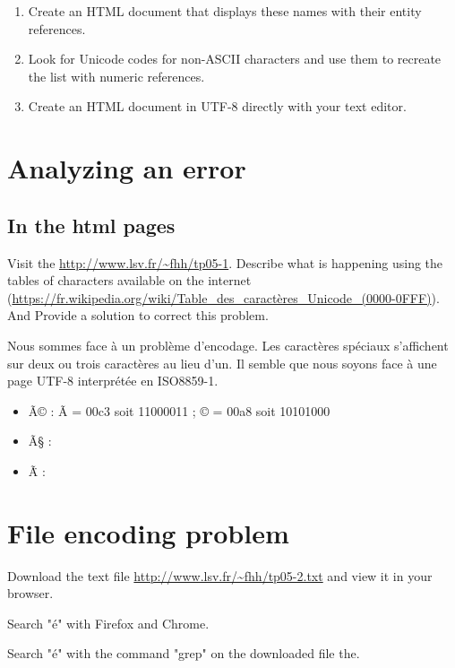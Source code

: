 \documentclass[11pt]{article}
\begin{document}
\begin{enumerate}
    \item Create an HTML document that displays these names with their entity references.
    \item Look for Unicode codes for non-ASCII characters and use them to recreate the list with numeric references.
    \item Create an HTML document in UTF-8 directly with your text editor.
\end{enumerate}




\section{Analyzing an error}


\subsection{In the html pages}
Visit the \url{http://www.lsv.fr/~fhh/tp05-1}\bigskip. Describe what is happening using the tables of characters available on the internet (\url{https://fr.wikipedia.org/wiki/Table_des_caractères_Unicode_(0000-0FFF)}). 
And Provide a solution to correct this problem.


\begin{solution}

Nous sommes face à un problème d'encodage. Les caractères spéciaux s'affichent
sur deux ou trois caractères au lieu d'un. Il semble que nous soyons face à une
page UTF-8 interprétée en ISO8859-1.

\begin{itemize}
\item Ã© : Ã = 00c3 soit 11000011 ; © = 00a8 soit 10101000
\item Ã§ :
\item Ã\"{ } : 
\end{itemize}

\end{solution}



\section{File encoding problem}
Download the text file \url{http://www.lsv.fr/~fhh/tp05-2.txt} and view it in your browser.

Search "é" with Firefox and Chrome.

Search "é" with the command "grep" on the downloaded file the. 
\end{document}
